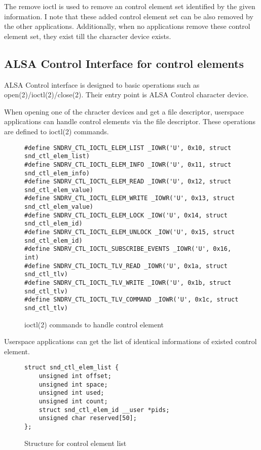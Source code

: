 \documentclass[onecolumn]{article}
\begin{document}
The remove ioctl is used to remove an control element set identified by the given information. I note that these added control element set can be also removed by the other applications. Additionally, when no applications remove these control element set, they exist till the character device exists.


\subsection{ALSA Control Interface for control elements}

ALSA Control interface is designed to basic operations such as open(2)/ioctl(2)/close(2). Their entry point is ALSA Control character device.

When opening one of the chracter devices and get a file descriptor, userspace applications can handle control elements via the file descriptor. These operations are defined to ioctl(2) commands.

\begin{figure}[htbp]
\small
\begin{verbatim}
#define SNDRV_CTL_IOCTL_ELEM_LIST _IOWR('U', 0x10, struct snd_ctl_elem_list)
#define SNDRV_CTL_IOCTL_ELEM_INFO _IOWR('U', 0x11, struct snd_ctl_elem_info)
#define SNDRV_CTL_IOCTL_ELEM_READ _IOWR('U', 0x12, struct snd_ctl_elem_value)
#define SNDRV_CTL_IOCTL_ELEM_WRITE _IOWR('U', 0x13, struct snd_ctl_elem_value)
#define SNDRV_CTL_IOCTL_ELEM_LOCK _IOW('U', 0x14, struct snd_ctl_elem_id)
#define SNDRV_CTL_IOCTL_ELEM_UNLOCK _IOW('U', 0x15, struct snd_ctl_elem_id)
#define SNDRV_CTL_IOCTL_SUBSCRIBE_EVENTS _IOWR('U', 0x16, int)
#define SNDRV_CTL_IOCTL_TLV_READ _IOWR('U', 0x1a, struct snd_ctl_tlv)
#define SNDRV_CTL_IOCTL_TLV_WRITE _IOWR('U', 0x1b, struct snd_ctl_tlv)
#define SNDRV_CTL_IOCTL_TLV_COMMAND _IOWR('U', 0x1c, struct snd_ctl_tlv)
\end{verbatim}
\caption{{ioctl(2) commands to handle control element}}
\label{ioctl-handle-element}
\end{figure}

Userspace applications can get the list of identical informations of existed control element.

\begin{figure}[htbp]
\small
\begin{verbatim}
struct snd_ctl_elem_list {
	unsigned int offset;
	unsigned int space;
	unsigned int used;
	unsigned int count;
	struct snd_ctl_elem_id __user *pids;
	unsigned char reserved[50];
};
\end{verbatim}
\caption{{Structure for control element list}}
\label{snd-ctl-elem-list}
\end{figure}
\end{document}
